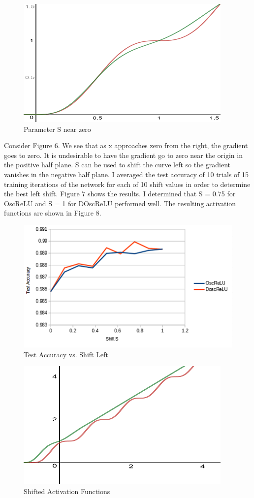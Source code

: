 \documentclass{amsart}
\theoremstyle{definition}
\theoremstyle{remark}
\numberwithin{equation}{section}
\newcommand{\blankbox}[2]{%
  \parbox{\columnwidth}{\centering
    \setlength{\fboxsep}{0pt}%
    \fbox{\raisebox{0pt}[#2]{\hspace{#1}}}%
  }%
}
\begin{document}
\begin{figure}[!h]
\includegraphics[1]{Shift.png}
\caption{Parameter S near zero}
\label{Figure 6}
\end{figure} 

Consider Figure 6. We see that as x approaches zero from the right, the gradient goes to zero.  It is undesirable to have the gradient go to zero near the origin in the positive half plane. S can be used to shift the curve left so the gradient vanishes in the negative half plane.  I averaged the test accuracy of 10 trials of 15 training iterations of the network for each of 10 shift values in order to determine the best left shift.  Figure 7 shows the results.  I determined that 
S = 0.75 for OscReLU and S = 1 for DOscReLU performed well.  The resulting activation functions are shown in Figure 8.

\begin{figure}[!h]
\includegraphics[1]{ShiftTest.png}
\caption{Test Accuracy vs. Shift Left}
\label{Figure 7}
\end{figure} 

\begin{figure}[!h]
\includegraphics[1]{ShiftedCurves.png}
\caption{Shifted Activation Functions}
\label{Figure 8}
\end{figure} 
\end{document}
